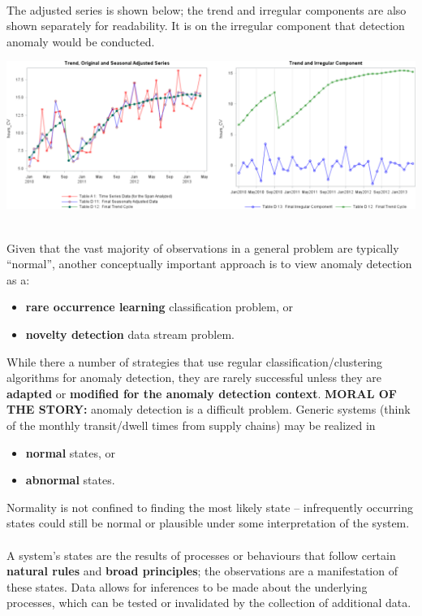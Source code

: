 \documentclass[20pt,landscape,footrule,headrule]{foils}
\newcommand{\newl}{\newline\newline}
\def\fh{\foilhead}
\begin{document}
\newpage \ \\ \noindent The adjusted series is shown below; the trend and irregular components are also shown separately for readability. \newl It is on the irregular component that detection anomaly would be conducted. 
\begin{center}
\includegraphics[width=\textwidth]{Images/adjustedplot.png}\end{center} 
\newpage\ \\ \noindent Given that the vast majority of observations in a general problem are typically ``normal'', another conceptually important approach is to view anomaly detection as a:
\begin{itemize}
\item \textbf{rare occurrence learning} classification problem, or \item  \textbf{novelty detection} data stream problem. \end{itemize} 
While there a number of strategies that use regular classification/clustering algorithms for anomaly detection, they are rarely successful unless they are \textbf{adapted} or \textbf{modified for the anomaly detection context}.
\newl \textbf{MORAL OF THE STORY:} anomaly detection is a difficult problem.
\fh{Basic Concepts}
\noindent Generic systems (think of the monthly transit/dwell times from supply chains) may be realized in 
\begin{itemize}
\item \textbf{normal} states, or  \item \textbf{abnormal} states. 
\end{itemize} 
Normality is not confined to finding the most likely state -- infrequently occurring states could still be normal or plausible under some interpretation of the system. \newpage\ \\ \noindent A system's states are the results of processes or behaviours that follow certain \textbf{natural rules} and \textbf{broad principles}; the observations are a manifestation of these states. \newl Data allows for inferences to be made about the underlying processes, which can be tested or invalidated by the collection of additional data. 
\end{document}
